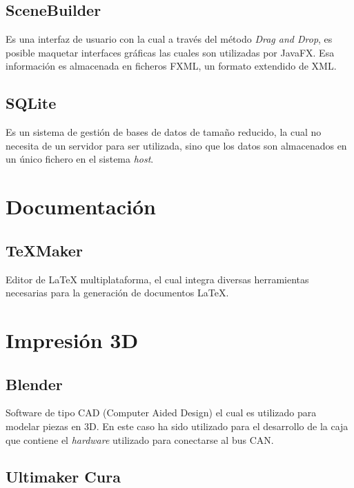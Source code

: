 \subsection{SceneBuilder}\label{scenebuilder}

Es una interfaz de usuario con la cual a través del método \emph{Drag and Drop}, es posible maquetar interfaces gráficas las cuales son utilizadas por JavaFX. Esa información es almacenada en ficheros FXML, un formato extendido de XML.

\subsection{SQLite}\label{sqlite}

Es un sistema de gestión de bases de datos de tamaño reducido, la cual no necesita de un servidor para ser utilizada, sino que los datos son almacenados en un único fichero en el sistema \emph{host}.

\section{Documentación}\label{documentacion}

\subsection{TeXMaker}\label{textmaker}

Editor de \LaTeX{} multiplataforma, el cual integra diversas herramientas necesarias para la generación de documentos \LaTeX{}.

\section{Impresión 3D}\label{impresion3d}

\subsection{Blender}\label{blender}

Software de tipo CAD (Computer Aided Design) el cual es utilizado para modelar piezas en 3D. En este caso ha sido utilizado para el desarrollo de la caja que contiene el \emph{hardware} utilizado para conectarse al bus CAN.

\subsection{Ultimaker Cura}\label{ultimaker_cura}

